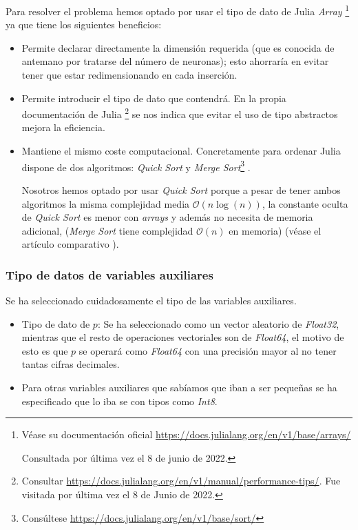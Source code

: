  Para resolver el problema hemos optado 
 por usar el tipo de dato de Julia 
 \textit{Array} \footnote{
    Véase su documentación oficial 
    \url{https://docs.julialang.org/en/v1/base/arrays/}

    Consultada por última vez el 8 de junio de 2022.
}
ya que tiene los siguientes beneficios: 
\begin{itemize}
    \item Permite declarar directamente la dimensión requerida (que es conocida de antemano por tratarse del número de neuronas); esto ahorraría en evitar tener que estar redimensionando en cada inserción.
    \item Permite introducir el tipo de dato que contendrá. En la propia documentación de Julia \footnote{
        Consultar \url{https://docs.julialang.org/en/v1/manual/performance-tips/}.
        Fue visitada por última vez el 8 de Junio de 2022.
    } se nos indica que evitar el uso de tipo abstractos mejora la eficiencia. 
    \item Mantiene el mismo coste computacional.
    Concretamente para ordenar Julia dispone de
    dos algoritmos: \textit{Quick Sort} y \textit{Merge Sort}\footnote{ Consúltese \url{https://docs.julialang.org/en/v1/base/sort/}} . 

    Nosotros hemos optado por usar \textit{Quick Sort} \cite{Quicksort} porque a pesar de tener ambos algoritmos la misma complejidad media $\mathcal{O}(n \log(n))$, la constante oculta de \textit{Quick Sort} es menor con \textit{arrays}  y además no necesita de memoria adicional, (\textit{Merge Sort} \cite{merge-sort} tiene complejidad $\mathcal{O}(n)$ en memoria) (véase el artículo comparativo \cite{quicksort-vs-merge-sort}).
\end{itemize}

\subsubsection{Tipo de datos de variables auxiliares}
Se ha seleccionado cuidadosamente el tipo de las variables auxiliares.
\begin{itemize}
    \item Tipo de dato de $p$: Se ha seleccionado como un vector aleatorio de \textit{Float32}, mientras que el resto de operaciones vectoriales son de \textit{Float64}, el motivo de esto es que $p$ se operará como \textit{Float64} con una precisión mayor al no tener tantas cifras decimales. 
    \item Para otras variables auxiliares que sabíamos que iban a ser pequeñas se ha especificado que lo iba se con tipos como \textit{Int8}.
\end{itemize}


